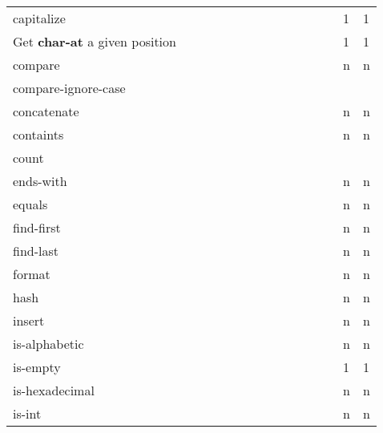 \documentclass[anonymous,sigplan,review,11pt,nonacm,natbib=false]{acmart}
\begin{document}
\begin{table*}
\begin{tabular}{lllllllllllllll}
            capitalize &  &  &  &  &  &  &  &  &  &  &  &  & 1 & 1 \\

            Get \textbf{char-at} a given position &  &  &  &  &  &  &  &  &  &  &  &  & 1 & 1 \\

            compare &  &  &  &  &  &  &  &  &  &  &  &  & n & n \\

            compare-ignore-case &  &  &  &  &  &  &  &  &  &  &  &  &  & \\

            concatenate &  &  &  &  &  &  &  &  &  &  &  &  & n & n \\

            containts &  &  &  &  &  &  &  &  &  &  &  &  & n & n \\

            count &  &  &  &  &  &  &  &  &  &  &  &  &  & \\

            ends-with &  &  &  &  &  &  &  &  &  &  &  &  & n & n \\

            equals &  &  &  &  &  &  &  &  &  &  &  &  & n & n \\

            find-first &  &  &  &  &  &  &  &  &  &  &  &  & n & n \\

            find-last &  &  &  &  &  &  &  &  &  &  &  &  & n & n \\

            format &  &  &  &  &  &  &  &  &  &  &  &  & n & n \\

            hash &  &  &  &  &  &  &  &  &  &  &  &  & n & n \\

            insert &  &  &  &  &  &  &  &  &  &  &  &  & n & n \\

            is-alphabetic &  &  &  &  &  &  &  &  &  &  &  &  & n & n \\

            is-empty &  &  &  &  &  &  &  &  &  &  &  &  & 1 & 1 \\

            is-hexadecimal &  &  &  &  &  &  &  &  &  &  &  &  & n & n \\

            is-int &  &  &  &  &  &  &  &  &  &  &  &  & n & n \\


\end{tabular}
\end{table*}
\end{document}
